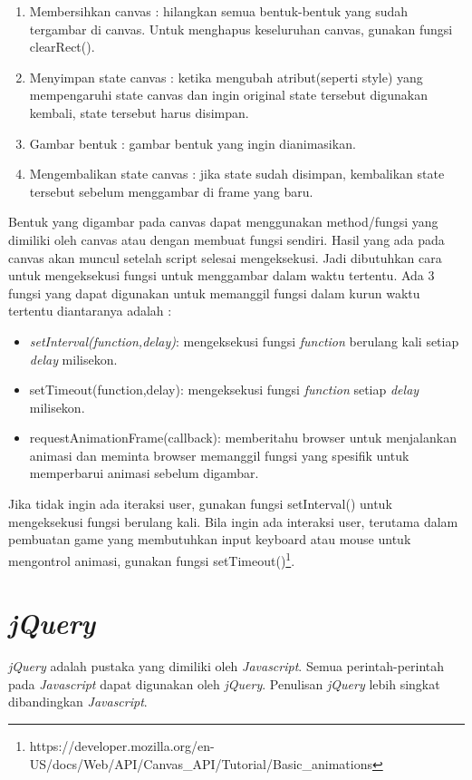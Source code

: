 \begin{enumerate}
	\item Membersihkan canvas : hilangkan semua bentuk-bentuk yang sudah tergambar di canvas. Untuk menghapus keseluruhan canvas, gunakan fungsi clearRect().
	\item Menyimpan state canvas : ketika mengubah atribut(seperti style) yang mempengaruhi state canvas dan ingin original state tersebut digunakan kembali, state tersebut harus disimpan. 
	\item Gambar bentuk : gambar bentuk yang ingin dianimasikan.
	\item Mengembalikan state canvas : jika state sudah disimpan, kembalikan state tersebut sebelum menggambar di frame yang baru.
\end{enumerate}

Bentuk yang digambar pada canvas dapat menggunakan method/fungsi yang dimiliki oleh canvas atau dengan membuat fungsi sendiri. Hasil yang ada pada canvas akan muncul setelah script selesai mengeksekusi. Jadi dibutuhkan cara untuk mengeksekusi fungsi untuk menggambar dalam waktu tertentu. Ada 3 fungsi yang dapat digunakan untuk memanggil fungsi dalam kurun waktu tertentu diantaranya adalah :

\begin{itemize}
	\item \textit{setInterval(function,delay)}: mengeksekusi fungsi \textit{function} berulang kali setiap \textit{delay} milisekon.
	\item setTimeout(function,delay): mengeksekusi fungsi \textit{function} setiap \textit{delay} milisekon.
	\item requestAnimationFrame(callback): memberitahu browser untuk menjalankan animasi dan meminta browser memanggil fungsi yang spesifik untuk memperbarui animasi sebelum digambar.
\end{itemize}

Jika tidak ingin ada iteraksi user, gunakan fungsi setInterval() untuk mengeksekusi fungsi berulang kali. Bila ingin ada interaksi user, terutama dalam pembuatan game yang membutuhkan input keyboard atau mouse untuk mengontrol animasi, gunakan fungsi setTimeout()\footnote{https://developer.mozilla.org/en-US/docs/Web/API/Canvas\_API/Tutorial/Basic\_animations}.

\section{\textit{jQuery}}
\textit{jQuery} adalah pustaka yang dimiliki oleh \textit{Javascript}. Semua perintah-perintah pada \textit{Javascript} dapat digunakan oleh \textit{jQuery}. Penulisan \textit{jQuery} lebih singkat dibandingkan \textit{Javascript}.

